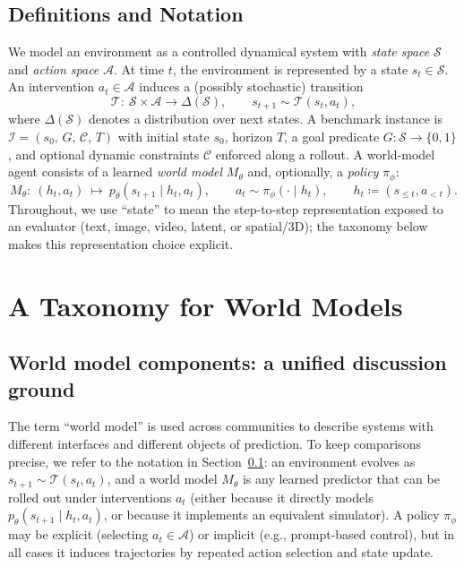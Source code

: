 \documentclass{article}
\theoremstyle{plain}
\theoremstyle{definition}
\theoremstyle{remark}
\begin{document}
\subsection{Definitions and Notation}
\label{subsec:defs_notation}
We model an environment as a controlled dynamical system with \emph{state space} $\mathcal{S}$ and \emph{action space} $\mathcal{A}$. At time $t$, the environment is represented by a state $s_t\in\mathcal{S}$. An intervention $a_t\in\mathcal{A}$ induces a (possibly stochastic) transition
\[
\mathcal{T}:\ \mathcal{S}\times\mathcal{A}\to \Delta(\mathcal{S}),\qquad s_{t+1}\sim \mathcal{T}(s_t,a_t),
\]
where $\Delta(\mathcal{S})$ denotes a distribution over next states.
A benchmark instance is $\mathcal{I}=(s_0,\,G,\,\mathcal{C},\,T)$ with initial state $s_0$, horizon $T$, a goal predicate $G:\mathcal{S}\to\{0,1\}$, and optional dynamic constraints $\mathcal{C}$ enforced along a rollout.
A world-model agent consists of a learned \emph{world model} $M_\theta$ and, optionally, a \emph{policy} $\pi_\phi$:
\[
M_\theta:\ (h_t,a_t)\ \mapsto\ p_\theta(s_{t+1}\mid h_t,a_t),\qquad a_t\sim \pi_\phi(\cdot\mid h_t),\qquad h_t\coloneqq (s_{\le t},a_{<t}).
\]
Throughout, we use ``state'' to mean the step-to-step representation exposed to an evaluator (text, image, video, latent, or spatial/3D); the taxonomy below makes this representation choice explicit.

\section{A Taxonomy for World Models}
\label{sec:taxonomy}
\subsection{World model components: a unified discussion ground}
The term ``world model'' is used across communities to describe systems with different interfaces and different objects of prediction. To keep comparisons precise, we refer to the notation in Section~\ref{subsec:defs_notation}: an environment evolves as $s_{t+1}\!\sim\!\mathcal{T}(s_t,a_t)$, and a world model $M_\theta$ is any learned predictor that can be rolled out under interventions $a_t$ (either because it directly models $p_\theta(s_{t+1}\mid h_t,a_t)$, or because it implements an equivalent simulator). A policy $\pi_\phi$ may be explicit (selecting $a_t\in\mathcal{A}$) or implicit (e.g., prompt-based control), but in all cases it induces trajectories by repeated action selection and state update.
\end{document}
